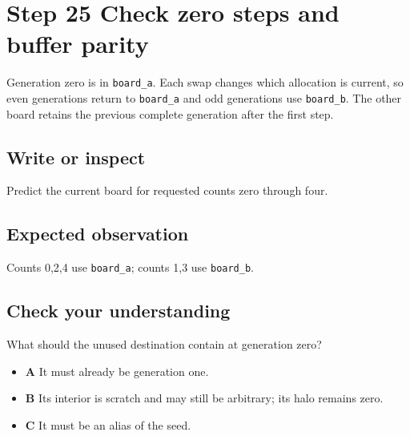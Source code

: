 \section{Step 25 Check zero steps and buffer
  parity}\label{008-life-generations-s25-step-25-check-zero-steps-and-buffer-parity}

Generation zero is in \texttt{board\_a}. Each swap changes which
allocation is current, so even generations return to \texttt{board\_a}
and odd generations use \texttt{board\_b}. The other board retains the
previous complete generation after the first step.

\subsection{Write or
  inspect}\label{008-life-generations-s25-write-or-inspect}

Predict the current board for requested counts zero through four.

\subsection{Expected
  observation}\label{008-life-generations-s25-expected-observation}

Counts 0,2,4 use \texttt{board\_a}; counts 1,3 use \texttt{board\_b}.

\subsection{Check your
  understanding}\label{008-life-generations-s25-check-your-understanding}

What should the unused destination contain at generation zero?

\begin{itemize}
  \tightlist
  \item
        \textbf{A} It must already be generation one.
  \item
        \textbf{B} Its interior is scratch and may still be arbitrary; its
        halo remains zero.
  \item
        \textbf{C} It must be an alias of the seed.
\end{itemize}
